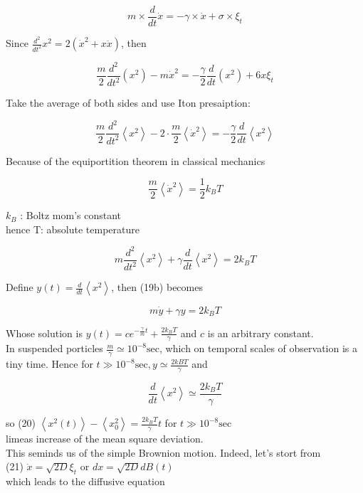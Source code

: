 \documentclass[10pt]{article}
\begin{document}
$$
m \times \frac{d}{d t} \dot{x}=-\gamma \times \dot{x}+\sigma \times \xi_{t}
$$

Since $\frac{d^{2}}{d t^{2}} x^{2}=2\left(\dot{x}^{2}+x \ddot{x}\right)$, then

$$
\frac{m}{2} \frac{d^{2}}{d t^{2}}\left(x^{2}\right)-m \dot{x}^{2}=-\frac{\gamma}{2} \frac{d}{d t}\left(x^{2}\right)+6 x \xi_{t}
$$

Take the average of both sides and use Iton presaiption:

$$
\frac{m}{2} \frac{d^{2}}{d t^{2}}\left\langle x^{2}\right\rangle-2 \cdot \frac{m}{2}\left\langle\dot{x}^{2}\right\rangle=-\frac{\gamma}{2} \frac{d}{d t}\left\langle x^{2}\right\rangle
$$

Because of the equiportition theorem in classical mechanics

$$
\frac{m}{2}\left\langle\dot{x}^{2}\right\rangle=\frac{1}{2} k_{B} T
$$

$k_{B}$ : Boltz mom's constant\\
hence T: absolute temperature


\begin{equation*}
m \frac{d^{2}}{d t^{2}}\left\langle x^{2}\right\rangle+\gamma \frac{d}{d t}\left\langle x^{2}\right\rangle=2 k_{B} T \tag{196}
\end{equation*}


Define $y(t)=\frac{d}{d t}\left\langle x^{2}\right\rangle$, then (19b) becomes

$$
m \dot{y}+\gamma y=2 k_{B} T
$$

Whose solution is $y(t)=c e^{-\frac{\gamma}{m} t}+\frac{2 k_{B} T}{\gamma}$ and $c$ is an arbitrary constant.\\
In suspended porticles $\frac{m}{\gamma} \simeq 10^{-8} \mathrm{sec}$, which on temporal scales of observation is a tiny time. Hence for $t \gg 10^{-8} \mathrm{sec}, y \simeq \frac{2 k B T}{\gamma}$ and

$$
\frac{d}{d t}\left\langle x^{2}\right\rangle \simeq \frac{2 k_{B} T}{\gamma}
$$

so (20) $\left\langle x^{2}(t)\right\rangle-\left\langle x_{0}^{2}\right\rangle=\frac{2 k_{B} T}{\gamma} t$ for $t \gg 10^{-8} \mathrm{sec}$\\
limeas increase of the mean square deviation.\\
This seminds us of the simple Brownion motion. Indeed, let's stort from\\
(21) $\dot{x}=\sqrt{2 D} \xi_{t}$ or $d x=\sqrt{2 D} d B(t)$\\
which leads to the diffusive equation
\end{document}
